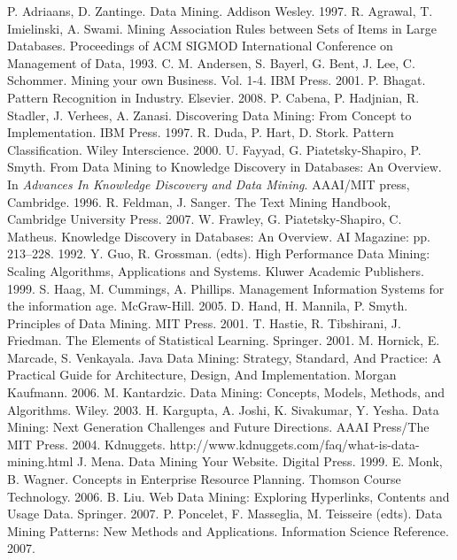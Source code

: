 \documentclass[10pt,latex8]{article}
\begin{document}
\begin{thebibliography}{}
P. Adriaans, D. Zantinge. Data Mining. Addison Wesley. 1997.
R. Agrawal, T. Imielinski, A. Swami. Mining Association Rules between Sets of Items in Large Databases. Proceedings of ACM SIGMOD International Conference on Management of Data, 1993.
C. M. Andersen, S. Bayerl, G. Bent, J. Lee, C. Schommer. Mining your own Business. Vol. 1-4. IBM Press. 2001.
P. Bhagat. Pattern Recognition in Industry. Elsevier. 2008.
P. Cabena, P. Hadjnian, R. Stadler, J. Verhees, A. Zanasi. Discovering Data Mining: From Concept to Implementation. IBM Press. 1997.
R. Duda, P. Hart, D. Stork. Pattern Classification. Wiley Interscience. 2000.
U. Fayyad, G. Piatetsky-Shapiro, P. Smyth. From Data Mining to Knowledge Discovery in Databases: An Overview. In \textit{Advances In Knowledge Discovery and Data Mining}. AAAI/MIT press, Cambridge. 1996.
R. Feldman, J. Sanger. The Text Mining Handbook, Cambridge University Press. 2007.
W. Frawley, G. Piatetsky-Shapiro, C. Matheus. Knowledge Discovery in Databases: An Overview. AI Magazine: pp. 213–228. 1992.
Y. Guo, R. Grossman. (edts). High Performance Data Mining: Scaling Algorithms, Applications and Systems. Kluwer Academic Publishers. 1999.
S. Haag, M. Cummings, A. Phillips. Management Information Systems for the information age. McGraw-Hill. 2005.
D. Hand, H. Mannila, P. Smyth. Principles of Data Mining. MIT Press. 2001.
T. Hastie, R. Tibshirani, J. Friedman. The Elements of Statistical Learning. Springer. 2001.
M. Hornick, E. Marcade, S. Venkayala. Java Data Mining: Strategy, Standard, And Practice: A Practical Guide for Architecture, Design, And Implementation. Morgan Kaufmann. 2006.
M. Kantardzic. Data Mining: Concepts, Models, Methods, and Algorithms. Wiley. 2003.
H. Kargupta, A. Joshi, K. Sivakumar, Y. Yesha. Data Mining: Next
Generation Challenges and Future Directions. AAAI Press/The MIT
Press. 2004.
Kdnuggets. http://www.kdnuggets.com/faq/what-is-data-mining.html
J. Mena. Data Mining Your Website. Digital Press. 1999.
E. Monk, B. Wagner. Concepts in Enterprise Resource Planning. Thomson Course Technology. 2006.
B. Liu. Web Data Mining: Exploring Hyperlinks, Contents and Usage Data. Springer. 2007.
P. Poncelet, F. Masseglia, M. Teisseire (edts). Data Mining Patterns: New Methods and Applications. Information Science Reference. 2007.

\end{thebibliography}
\end{document}
